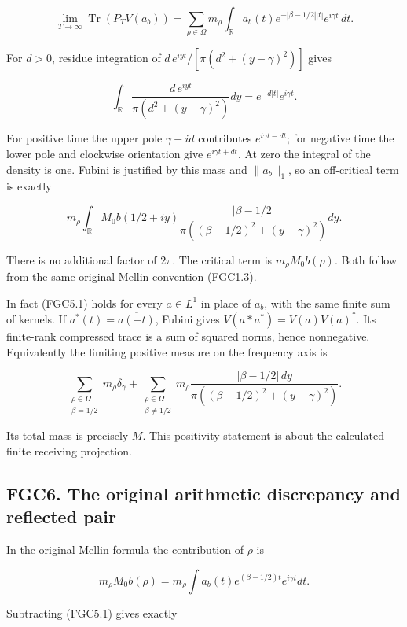 \[
 \lim_{T\to\infty}\operatorname{Tr}(P_TV(a_b))
 =\sum_{\rho\in\Omega}m_\rho\int_{\mathbb R}
 a_b(t)e^{-|\beta-1/2||t|}e^{i\gamma t}\,dt.
\tag{FGC5.1}
\]

For \(d>0\), residue integration of
\(d\,e^{iyt}/[\pi(d^2+(y-\gamma)^2)]\) gives

\[
 \int_{\mathbb R}\frac{d\,e^{iyt}}{\pi(d^2+(y-\gamma)^2)}dy
 =e^{-d|t|}e^{i\gamma t}.
\tag{FGC5.2}
\]

For positive time the upper pole \(\gamma+id\) contributes
\(e^{i\gamma t-dt}\); for negative time the lower pole and clockwise
orientation give \(e^{i\gamma t+dt}\). At zero the integral of the
density is one. Fubini is justified by this mass and \(\|a_b\|_1\), so
an off-critical term is exactly

\[
 m_\rho\int_{\mathbb R}M_0b(1/2+iy)
 \frac{|\beta-1/2|}{\pi((\beta-1/2)^2+(y-\gamma)^2)}dy.
\tag{FGC5.3}
\]

There is no additional factor of \(2\pi\). The critical term is
\(m_\rho M_0b(\rho)\). Both follow from the same original Mellin
convention (FGC1.3).

In fact (FGC5.1) holds for every \(a\in L^1\) in place of \(a_b\), with
the same finite sum of kernels. If \(a^*(t)=\overline{a(-t)}\), Fubini
gives \(V(a*a^*)=V(a)V(a)^*\). Its finite-rank compressed trace is a sum
of squared norms, hence nonnegative. Equivalently the limiting positive
measure on the frequency axis is

\[
 \sum_{\substack{\rho\in\Omega\\\beta=1/2}}m_\rho\delta_\gamma
 +\sum_{\substack{\rho\in\Omega\\\beta\ne1/2}}
 m_\rho\frac{|\beta-1/2|\,dy}
 {\pi((\beta-1/2)^2+(y-\gamma)^2)}.
\tag{FGC5.4}
\]

Its total mass is precisely \(M\). This positivity statement is about
the calculated finite receiving projection.

\subsection{FGC6. The original arithmetic discrepancy and reflected
pair}\label{fgc6.-the-original-arithmetic-discrepancy-and-reflected-pair}

In the original Mellin formula the contribution of \(\rho\) is

\[
 m_\rho M_0b(\rho)=m_\rho\int a_b(t)
 e^{(\beta-1/2)t}e^{i\gamma t}dt.
\]

Subtracting (FGC5.1) gives exactly

